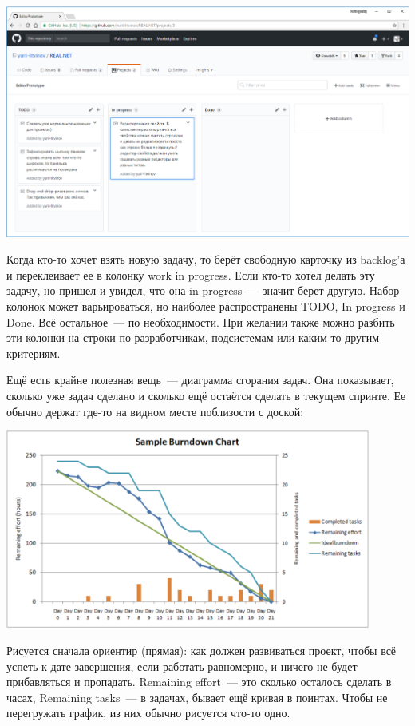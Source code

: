 \documentclass{../../text-style}
\begin{document}
\begin{center}
    \includegraphics[width=\textwidth]{githubProjects.png}
\end{center}

Когда кто-то хочет взять новую задачу, то берёт свободную карточку из backlog’а и переклеивает ее в колонку work in progress. Если кто-то хотел делать эту задачу, но пришел и увидел, что она in progress~--- значит берет другую. Набор колонок может варьироваться, но наиболее распространены TODO, In progress и Done. Всё остальное~--- по необходимости. При желании также можно разбить эти колонки на строки по разработчикам, подсистемам или каким-то другим критериям.

Ещё есть крайне полезная вещь~--- диаграмма сгорания задач. Она показывает, сколько уже задач сделано и сколько ещё остаётся сделать в текущем спринте. Ее обычно держат где-то на видном месте поблизости с доской: 

\begin{center}
    \includegraphics[width=0.9\textwidth]{burndownChart.png}
\end{center}

Рисуется сначала ориентир (прямая): как должен развиваться проект, чтобы всё успеть к дате завершения, если работать равномерно, и ничего не будет прибавляться и пропадать. Remaining effort~--- это сколько осталось сделать в часах, Remaining tasks~--- в задачах, бывает ещё кривая в поинтах. Чтобы не перегружать график, из них обычно рисуется что-то одно.
\end{document}
